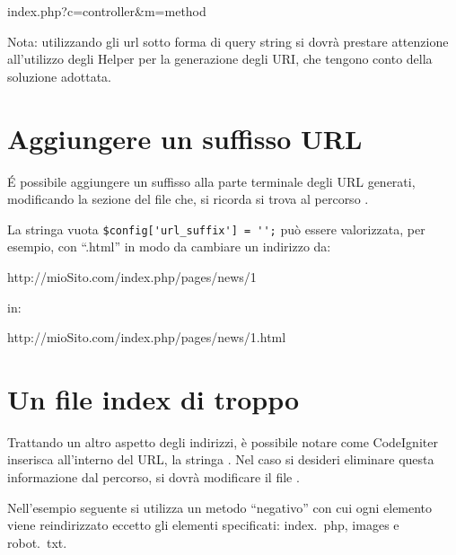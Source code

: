\begin{code}
index.php?c=controller&m=method
\end{code}

Nota: utilizzando gli url sotto forma di query string si dovrà prestare attenzione all'utilizzo degli Helper per la generazione degli \ac{URI}, che tengono conto della soluzione adottata.

\section{Aggiungere un suffisso URL}
\'E possibile aggiungere un suffisso alla parte terminale degli \ac{URL} generati, modificando la sezione  del file  che, si ricorda si trova al percorso  . 

La stringa vuota \verb|$config['url_suffix'] = '';| può essere valorizzata, per esempio, con ``.html'' in modo da cambiare un indirizzo da: 

\begin{code}
http://mioSito.com/index.php/pages/news/1
\end{code}

in:

\begin{code}
http://mioSito.com/index.php/pages/news/1.html
\end{code}

\label{sec:index}
\section{Un file index di troppo}
Trattando un altro aspetto degli indirizzi, è possibile notare come CodeIgniter inserisca all'interno del \ac{URL}, la stringa . Nel caso si desideri eliminare questa informazione dal percorso, si dovrà modificare il file . 

Nell'esempio seguente si utilizza un metodo ``negativo'' con cui ogni elemento viene reindirizzato eccetto gli elementi specificati: index.~php, images e robot.~txt.

